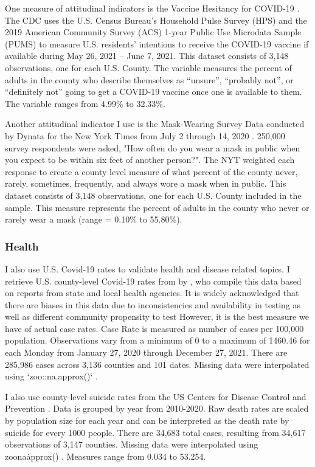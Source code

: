 One measure of attitudinal indicators is the Vaccine Hesitancy for COVID-19
\citep{vaches_data}. The CDC uses the U.S. Census Bureau’s Household Pulse Survey
(HPS) and the 2019 American Community Survey (ACS) 1-year Public Use Microdata
Sample (PUMS) to measure U.S. residents’ intentions to receive the COVID-19
vaccine if available during May 26, 2021 – June 7, 2021. This dataset consists
of 3,148 observations, one for each U.S. County. The variable
measures the percent of adults in the county who describe themselves as
“unsure”, “probably not”, or “definitely not” going to get a COVID-19 vaccine
once one is available to them. The variable ranges from 4.99\% to 32.33\%. 

Another attitudinal indicator I use is the Mask-Wearing Survey Data conducted by
Dynata for the New York Times from July 2 through 14, 2020 \citep{mask_data}. 250,000
survey respondents were asked, "How often do you wear a mask in public when you
expect to be within six feet of another person?". The NYT weighted each response
to create a county level measure of what percent of the county never, rarely,
sometimes, frequently, and always wore a mask when in public. This dataset
consists of 3,148 observations, one for each U.S. County included in the sample. This measure
represents the percent of adults in the county who never or rarely wear a mask
(range = 0.10\% to 55.80\%).

\subsubsection{Health}

I also use U.S. Covid-19 rates to validate health and disease related topics. I
retrieve U.S. county-level Covid-19 rates from by \citet{covid_data}, who compile this
data based on reports from state and local health agencies. It is widely
acknowledged that there are biases in this data due to inconsistencies and
availability in testing as well as different community propensity to test
\citep{gu22, cdc20a} However, it is the best measure we have of actual case rates.
Case Rate is measured as number of cases per 100,000 population. Observations
vary from a minimum of 0 to a maximum of 1460.46 for each Monday from January 27, 2020 through
December 27, 2021. There are 285,986 cases across 3,136 counties and 101
dates. Missing data were interpolated using `zoo::na.approx()` \citep{zoo}.

I also use county-level suicide rates from the US Centers for Disease Control
and Prevention \citeyearpar{suic_data}. Data is grouped by year from 2010-2020. Raw death
rates are scaled by population size for each year and can be interpreted as the
death rate by suicide for every 1000 people. There are 34,683 total
cases, resulting from 34,617 observations of 3,147 counties. Missing data were interpolated using
zoo\:\:na\.approx() \citep{zoo}. Measures range from 0.034 to 53.254.


